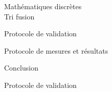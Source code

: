\documentclass{article}
\begin{document}
\begin{center} 
\Huge{Mathématiques discrètes \\ Tri fusion}
\end{center}




\begin{section}{Protocole de validation}
\end{section}


\begin{section}{Protocole de mesures et résultats}
\end{section}


\begin{section}{Conclusion}
\end{section}

\begin{section}{Protocole de validation}
\end{section}
\end{document}
